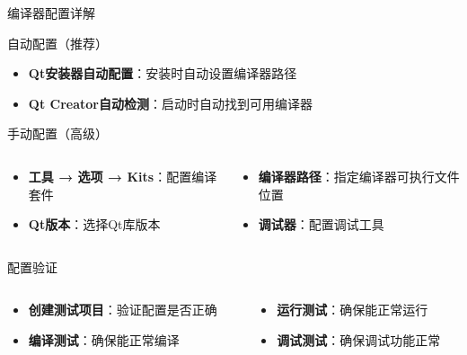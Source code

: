 \documentclass[UTF8,aspectratio=169]{beamer}
\begin{document}
\begin{frame}{编译器配置详解}
    \begin{ytublock}{自动配置（推荐）}
        \begin{itemize}
            \item \textbf{Qt安装器自动配置}：安装时自动设置编译器路径
            \item \textbf{Qt Creator自动检测}：启动时自动找到可用编译器
        \end{itemize}
    \end{ytublock}

    \begin{ytublock}{手动配置（高级）}
        \begin{columns}
            \begin{column}{0.48\textwidth}
                \begin{itemize}
                    \item \textbf{工具 → 选项 → Kits}：配置编译套件
                    \item \textbf{Qt版本}：选择Qt库版本
                \end{itemize}
            \end{column}
            \hspace{0.02\textwidth}
            \begin{column}{0.48\textwidth}
                \begin{itemize}
                    \item \textbf{编译器路径}：指定编译器可执行文件位置
                    \item \textbf{调试器}：配置调试工具
                \end{itemize}
            \end{column}
        \end{columns}
    \end{ytublock}

    \begin{ytublock}{配置验证}
        \begin{columns}
            \begin{column}{0.48\textwidth}
                \begin{itemize}
                    \item \textbf{创建测试项目}：验证配置是否正确
                    \item \textbf{编译测试}：确保能正常编译
                \end{itemize}
            \end{column}
            \hspace{0.02\textwidth}
            \begin{column}{0.48\textwidth}
                \begin{itemize}
                    \item \textbf{运行测试}：确保能正常运行
                    \item \textbf{调试测试}：确保调试功能正常
                \end{itemize}
            \end{column}
        \end{columns}
    \end{ytublock}
\end{frame}
\end{document}
